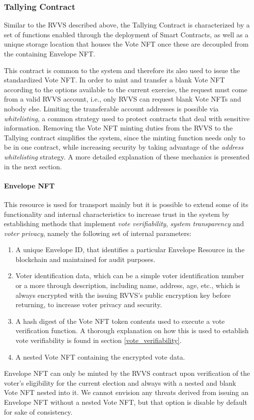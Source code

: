         \subsubsection{Tallying Contract}
        Similar to the RVVS described above, the Tallying Contract is characterized by a set of functions enabled through the deployment of Smart Contracts, as well as a unique storage location that houses the Vote NFT once these are decoupled from the containing Envelope NFT.
        \par
        This contract is common to the system and therefore its also used to issue the standardized Vote NFT. In order to mint and transfer a blank Vote NFT according to the options available to the current exercise, the request must come from a valid RVVS account, i.e., only RVVS can request blank Vote NFTs and nobody else. Limiting the transferable account addresses is possible via \textit{whitelisting}, a common strategy used to protect contracts that deal with sensitive information. Removing the Vote NFT minting duties from the RVVS to the Tallying contract simplifies the system, since the minting function needs only to be in one contract, while increasing security by taking advantage of the \textit{address whitelisting} strategy.
        A more detailed explanation of these mechanics is presented in the next section. 

        \paragraph{Envelope NFT}
        This resource is used for transport mainly but it is possible to extend some of its functionality and internal characteristics to increase trust in the system by establishing methods that implement \textit{vote verifiability}, \textit{system transparency} and \textit{voter privacy}, namely the following set of internal parameters:
        \begin{enumerate}
            \item {A unique Envelope ID}, that identifies a particular Envelope Resource in the blockchain and maintained for audit purposes.
            \item {Voter identification data}, which can be a simple voter identification number or a more through description, including name, address, age, etc., which is always encrypted with the issuing RVVS's public encryption key before returning, to increase voter privacy and security.
            \item {A hash digest of the Vote NFT token contents} used to execute a vote verification function. A thorough explanation on how this is used to establish vote verifiability is found in section \ref{vote_verifiability}.
            \item {A nested Vote NFT} containing the encrypted vote data. 
        \end{enumerate}
        Envelope NFT can only be minted by the RVVS contract upon verification of the voter's eligibility for the current election and always with a nested and blank Vote NFT nested into it. We cannot envision any threats derived from issuing an Envelope NFT without a nested Vote NFT, but that option is disable by default for sake of consistency.

